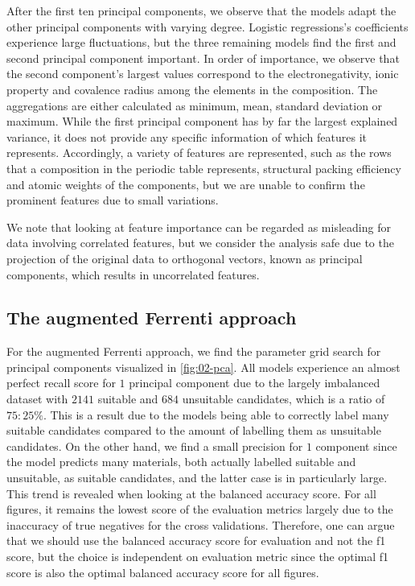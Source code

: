 After the first ten principal components, we observe that the models adapt the other principal components with varying degree. Logistic regressions's coefficients experience large fluctuations, but the three remaining models find the first and second principal component important. In order of importance, we observe that the second component's largest values correspond to the electronegativity, ionic property and covalence radius among the elements in the composition. The aggregations are either calculated as minimum, mean, standard deviation or maximum. While the first principal component has by far the largest explained variance, it does not provide any specific information of which features it represents. Accordingly, a variety of features are represented, such as the rows that a composition in the periodic table represents, structural packing efficiency and atomic weights of the components, but we are unable to confirm the prominent features due to small variations.

We note that looking at feature importance can be regarded as misleading for data involving correlated features, but we consider the analysis safe due to the projection of the original data to orthogonal vectors, known as principal components, which results in uncorrelated features.



\subsection{The augmented Ferrenti approach}

For the augmented Ferrenti approach, we find the parameter grid search for principal components visualized in \autoref{fig:02-pca}. All models experience an almost perfect recall score for $1$ principal component due to the largely imbalanced dataset with $2141$ suitable and $684$ unsuitable candidates, which is a ratio of $75:25 \%$. This is a result due to the models being able to correctly label many suitable candidates compared to the amount of labelling them as unsuitable candidates. On the other hand, we find a small precision for $1$ component since the model predicts many materials, both actually labelled suitable and unsuitable, as suitable candidates, and the latter case is in particularly large. This trend is revealed when looking at the balanced accuracy score. For all figures, it remains the lowest score of the evaluation metrics largely due to the inaccuracy of true negatives for the cross validations. Therefore, one can argue that we should use the balanced accuracy score for evaluation and not the f1 score, but the choice is independent on evaluation metric since the optimal f1 score is also the optimal balanced accuracy score for all figures.


